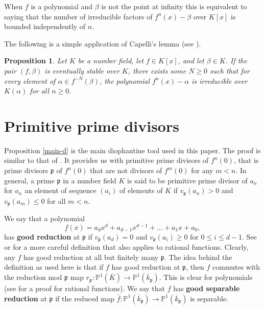 \documentclass[11pt]{amsart}
\newtheorem{prop}[thm]{Proposition}
\theoremstyle{definition}
\theoremstyle{definition}
\numberwithin{thm}{section}
\numberwithin{equation}{thm}
\renewcommand{\P}{\ensuremath{{\mathbb{P}}}}
\newcommand{\fp}{\ensuremath{{\mathfrak{p}}}}
\newcommand{\Kbar}{\ensuremath {\overline K}}
\begin{document}
When $f$ is a polynomial and $\beta$ is not the point at infinity this
is equivalent to saying that the number of irreducible factors of
$f^n(x) - \beta$ over $K[x]$ is bounded independently of $n$.

The following is a simple application of Capelli's lemma (see
\cite[Proposition 4.1]{BT2}).

\begin{prop}\label{from-BT2}
Let $K$ be a number field, let $f \in K[x]$, and let $\beta \in K$.
If the pair $(f,\beta)$ is eventually stable over $K$, there exists some
$N\ge 0$ such that for every element of $\alpha \in f^{-N}(\beta)$, the
polynomial $f^n(x) - \alpha$ is irreducible over $K(\alpha)$ for
all $n \ge 0$.  
\end{prop}




  

\section{Primitive prime divisors}\label{prim}

Proposition \ref{main-d} is the main diophantine tool used in this
paper.  The proof is similar to that of \cite[Proposition 12]{BIJJ}.
It provides us with primitive prime divisors of $f^n(0)$, that is
prime divisors $\fp$ of $f^n(0)$ that are not divisors of $f^m(0)$ for any $m <
n$.  In general, a prime $\fp$ in a number field $K$ is said to be
primitive prime divisor of $a_n$ for $a_n$ an element of sequence
$(a_i)$ of elements of $K$ if $v_\fp(a_n) > 0$ and $v_\fp(a_m) \leq 0$
for all $m < n$.  



We say that a polynomial
\[
f(x) = a_dx^d + a_{d-1}x^{d-1}+\dots + a_1x + a_0,
\]
has {\bf good reduction} at $\fp$ if $v_\fp(a_d)=0$ and
$v_\fp(a_i)\geq 0$ for $0\leq i\leq d-1$. See \cite{MortonSilverman}
or \cite[Theorem 2.15]{SilvermanADS} for a more careful definition
that also applies to rational functions. Clearly, any $f$ has good
reduction at all but finitely many $\fp$. The idea behind the
definition as used here is that if $f$ has good reduction at $\fp$,
then $f$ commutes with the reduction mod $\fp$ map
$r_\fp: \P^1(\Kbar)\to \P^1(\overline{k}_\fp)$. This is clear
for polynomials (see \cite[Theorem 2.18]{SilvermanADS} for a proof for
rational functions). We say that $f$ has {\bf good separable
  reduction} at $\fp$ if the reduced map
$\bar{f}:\P^1(\overline{k}_\fp)\to\P^1(\overline{k}_\fp)$ is
separable.
\end{document}

